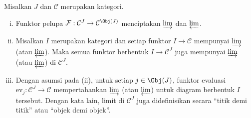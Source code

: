 \begin{proposisi}\label{prop:forget-create}
	Misalkan $J$ dan $\mathcal{C}$ merupakan kategori.
	\begin{enumerate}[(i)]
		\item Funktor pelupa
		$\mathcal{F}: \mathcal{C}^J \to \mathcal{C}^{\Obj(J)}$ menciptakan
		$\varinjlim$ dan $\varprojlim$.
		\item Misalkan $I$ merupakan kategori dan setiap funktor
		$I \to \mathcal{C}$ mempunyai $\varinjlim$ (atau $\varprojlim$).
		Maka semua funktor berbentuk $I \to \mathcal{C}^J$ juga mempunyai
		$\varinjlim$ (atau $\varprojlim$) di $\mathcal{C}^J$.
		\item Dengan asumsi pada (ii), untuk setiap $j \in \Obj(J)$, funktor
		evaluasi $\mathrm{ev}_j: \mathcal{C}^J \to \mathcal{C}$ mempertahankan
		$\varinjlim$ (atau $\varprojlim$) untuk diagram berbentuk $I$ tersebut.
		Dengan kata lain, limit di $\mathcal{C}^J$ juga didefinisikan
		secara ``titik demi titik'' atau ``objek demi objek''.
	\end{enumerate}
\end{proposisi}
